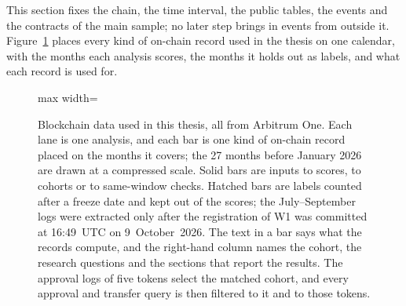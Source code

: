 
This section fixes the chain, the time interval, the public tables, the events and the contracts of the main sample; no later step brings in events from outside it. Figure~\ref{fig:data-overview} places every kind of on-chain record used in the thesis on one calendar, with the months each analysis scores, the months it holds out as labels, and what each record is used for.

\begin{figure}[htbp]
\centering
\begin{adjustbox}{max width=\linewidth}

\end{adjustbox}
\caption[{Blockchain data used in this thesis: sources, months covered, held-out labels and uses.}]{Blockchain data used in this thesis, all from Arbitrum One. Each lane is one analysis, and each bar is one kind of on-chain record placed on the months it covers; the 27 months before January 2026 are drawn at a compressed scale. Solid bars are inputs to scores, to cohorts or to same-window checks. Hatched bars are labels counted after a freeze date and kept out of the scores; the July--September logs were extracted only after the registration of W1 was committed at 16:49~UTC on 9~October~2026. The text in a bar says what the records compute, and the right-hand column names the cohort, the research questions and the sections that report the results. The approval logs of five tokens select the matched cohort, and every approval and transfer query is then filtered to it and to those tokens.}
\label{fig:data-overview}
\end{figure}

